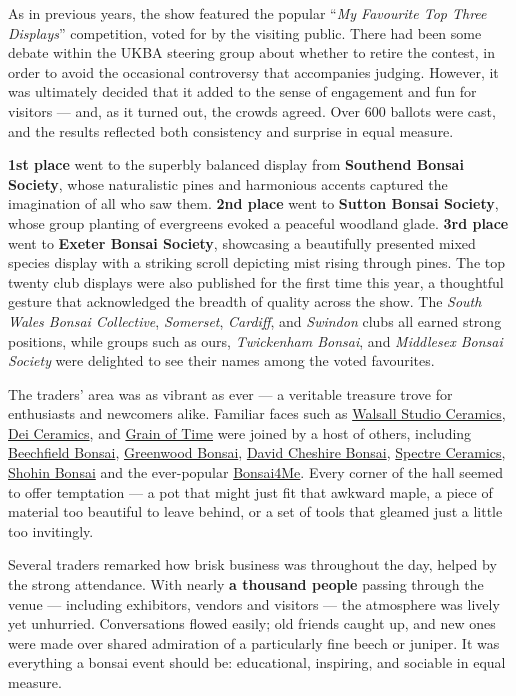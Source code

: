 As in previous years, the show featured the popular ``\textit{My Favourite Top Three Displays}'' competition, voted for by the visiting public.
There had been some debate within the UKBA steering group about whether to retire the contest, in order to avoid the occasional controversy that accompanies judging.
However, it was ultimately decided that it added to the sense of engagement and fun for visitors --- and, as it turned out, the crowds agreed.
Over 600 ballots were cast, and the results reflected both consistency and surprise in equal measure.

\textbf{1st place} went to the superbly balanced display from \textbf{Southend Bonsai Society}, whose naturalistic pines and harmonious accents captured the imagination of all who saw them.
\textbf{2nd place} went to \textbf{Sutton Bonsai Society}, whose group planting of evergreens evoked a peaceful woodland glade.
\textbf{3rd place} went to \textbf{Exeter Bonsai Society}, showcasing a beautifully presented mixed species display with a striking scroll depicting mist rising through pines.
The top twenty club displays were also published for the first time this year, a thoughtful gesture that acknowledged the breadth of quality across the show.
The \textit{South Wales Bonsai Collective}, \textit{Somerset}, \textit{Cardiff}, and \textit{Swindon} clubs all earned strong positions, while groups such as ours, \textit{Twickenham Bonsai}, and \textit{Middlesex Bonsai Society} were delighted to see their names among the voted favourites.

The traders' area was as vibrant as ever --- a veritable treasure trove for enthusiasts and newcomers alike.
Familiar faces such as \href{https://www.instagram.com/walsallstudioceramics/}{Walsall Studio Ceramics}, \href{https://deiceramics.com}{Dei Ceramics}, and \href{https://grainoftime.co.uk}{Grain of Time} were joined by a host of others, including \href{https://www.beechfieldbonsai.co.uk/}{Beechfield Bonsai}, \href{https://www.bonsai.co.uk}{Greenwood Bonsai}, \href{https://www.davidcheshirenurseries.co.uk}{David Cheshire Bonsai}, \href{https://www.facebook.com/p/Spectre-ceramics-100065407593513/}{Spectre Ceramics}, \href{https://www.instagram.com/shohinuk/}{Shohin Bonsai} and the ever\--popular \href{https://bonsai4me.com}{Bonsai4Me}.
Every corner of the hall seemed to offer temptation --- a pot that might just fit that awkward maple, a piece of material too beautiful to leave behind, or a set of tools that gleamed just a little too invitingly.

Several traders remarked how brisk business was throughout the day, helped by the strong attendance.
With nearly \textbf{a thousand people} passing through the venue --- including exhibitors, vendors and visitors --- the atmosphere was lively yet unhurried.
Conversations flowed easily; old friends caught up, and new ones were made over shared admiration of a particularly fine beech or juniper.
It was everything a bonsai event should be: educational, inspiring, and sociable in equal measure.


